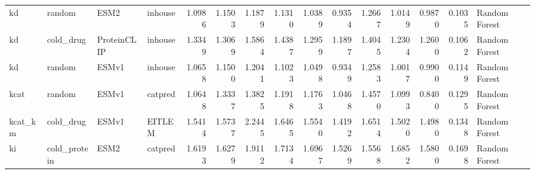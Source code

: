 \begin{tabular}{llllrrrrrrrrrrl}
kd & random & ESM2 & inhouse & 1.0986 & 1.1503 & 1.1879 & 1.1310 & 1.0389 & 0.9354 & 1.2667 & 1.0149 & 0.9870 & 0.1035 & Random Forest \\
kd & cold_drug & ProteinCLIP & inhouse & 1.3349 & 1.3069 & 1.5864 & 1.4387 & 1.2959 & 1.1897 & 1.4045 & 1.2304 & 1.2600 & 0.1062 & Random Forest \\
kd & random & ESMv1 & inhouse & 1.0658 & 1.1500 & 1.2041 & 1.1023 & 1.0498 & 0.9349 & 1.2583 & 1.0017 & 0.9900 & 0.1149 & Random Forest \\
kcat & random & ESMv1 & catpred & 1.0648 & 1.3337 & 1.3825 & 1.1918 & 1.1763 & 1.0468 & 1.4570 & 1.0993 & 0.8400 & 0.1295 & Random Forest \\
kcat_km & cold_drug & ESMv1 & EITLEM & 1.5414 & 1.5737 & 2.2445 & 1.6465 & 1.5540 & 1.4192 & 1.6514 & 1.5020 & 1.4980 & 0.1348 & Random Forest \\
ki & cold_protein & ESM2 & catpred & 1.6193 & 1.6279 & 1.9112 & 1.7134 & 1.6967 & 1.5269 & 1.5568 & 1.6852 & 1.5800 & 0.1698 & Random Forest \\
\bottomrule
\end{tabular}
